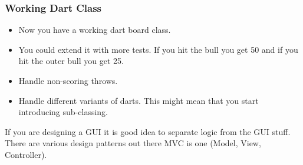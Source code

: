 \documentclass{beamer}
\begin{document}
%
 \begin{frame}
    \frametitle{Working Dart Class}
    \begin{itemize}
    \item Now you have a working dart board class. 
    \item You could extend it with more tests. If you hit the bull you
      get 50 and if you hit the outer bull you get 25. 
    \item Handle non-scoring throws. 
    \item Handle different variants of darts. This might mean that you
      start introducing sub-classing.
    \end{itemize}
 If you are designing a GUI it is good idea to separate logic from the
 GUI stuff. There are various design patterns out there MVC is one
 (Model, View, Controller).
 
  \end{frame}
\end{document}
